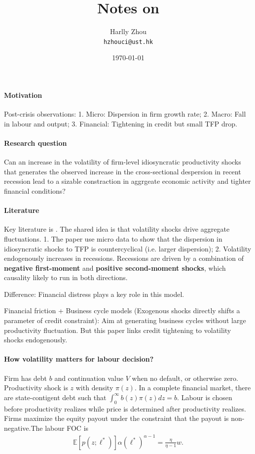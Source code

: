 \documentclass[12pt]{article}
\title{Notes on \cite{arellanoFinancialFrictionsFluctuations2019}}
\author{Harlly Zhou \\ \texttt{hzhouci@ust.hk}}
\date{\today}
\numberwithin{equation}{section}
\begin{document}
\maketitle

\paragraph{Motivation} Post-crisis observations: 1. Micro: Dispersion in firm growth rate; 2. Macro: Fall in labour and output; 3. Financial: Tightening in credit but small TFP drop.

\paragraph{Research question} Can an increase in the volatility of firm-level idiosyncratic productivity shocks that generates the observed increase in the cross-sectional despersion in recent recession lead to a sizable constraction in aggrgeate economic activity and tighter financial conditions?

\paragraph{Literature} Key literature is \cite{bloomReallyUncertainBusiness2018}. The shared idea is that volatility shocks drive aggregate fluctuations. 1. The paper use micro data to show that the dispersion in idiosyncratic shocks to TFP is countercyclical (i.e. larger dispersion); 2. Volatility endogenously increases in recessions. Recessions are driven by a combination of \textbf{negative first-moment} and \textbf{positive second-moment shocks}, which causality likely to run in both directions.

Difference: Financial distress plays a key role in this model. 

Financial friction + Business cycle models (Exogenous shocks directly shifts a parameter of credit constraint): Aim at generating business cycles without large productivity fluctuation. But this paper links credit tightening to volatility shocks endogenously. 

\paragraph{How volatility matters for labour decision?} Firm has debt $b$ and continuation value $V$ when no default, or otherwise zero. Productivity shock is $z$ with density $\pi(z)$. In a complete financial market, there are state-contigent debt such that $\int^{\infty}_0 b(z) \pi(z) dz = b$. Labour is chosen before productivity realizes while price is determined after productivity realizes. Firms maximize the equity payout under the constraint that the payout is non-negative.The labour FOC is
\begin{align*}
	\mathbb{E}[p(z;\ell^*)]\alpha (\ell^*)^{\alpha-1} = \frac{\eta}{\eta-1} w.
\end{align*}
\end{document}
